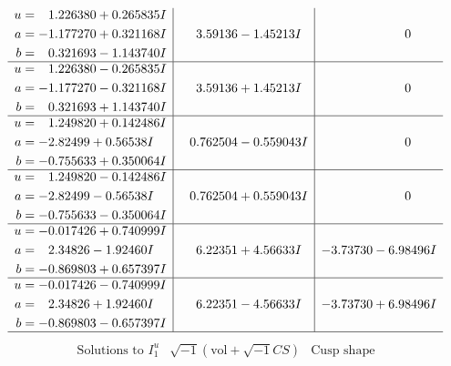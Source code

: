 \documentclass[1p]{elsarticle_modified}
\theoremstyle{definition}
\newcommand{\I}{\sqrt{-1}}
\begin{document}
$$\begin{array}{c|c|c}
\begin{aligned}
u &= \phantom{-}1.226380 + 0.265835 I \\
a &= -1.177270 + 0.321168 I \\
b &= \phantom{-}0.321693 - 1.143740 I\end{aligned}
 & \phantom{-}3.59136 - 1.45213 I & \phantom{-0.000000 } 0 \\ \hline\begin{aligned}
u &= \phantom{-}1.226380 - 0.265835 I \\
a &= -1.177270 - 0.321168 I \\
b &= \phantom{-}0.321693 + 1.143740 I\end{aligned}
 & \phantom{-}3.59136 + 1.45213 I & \phantom{-0.000000 } 0 \\ \hline\begin{aligned}
u &= \phantom{-}1.249820 + 0.142486 I \\
a &= -2.82499 + 0.56538 I \\
b &= -0.755633 + 0.350064 I\end{aligned}
 & \phantom{-}0.762504 - 0.559043 I & \phantom{-0.000000 } 0 \\ \hline\begin{aligned}
u &= \phantom{-}1.249820 - 0.142486 I \\
a &= -2.82499 - 0.56538 I \\
b &= -0.755633 - 0.350064 I\end{aligned}
 & \phantom{-}0.762504 + 0.559043 I & \phantom{-0.000000 } 0 \\ \hline\begin{aligned}
u &= -0.017426 + 0.740999 I \\
a &= \phantom{-}2.34826 - 1.92460 I \\
b &= -0.869803 + 0.657397 I\end{aligned}
 & \phantom{-}6.22351 + 4.56633 I & -3.73730 - 6.98496 I \\ \hline\begin{aligned}
u &= -0.017426 - 0.740999 I \\
a &= \phantom{-}2.34826 + 1.92460 I \\
b &= -0.869803 - 0.657397 I\end{aligned}
 & \phantom{-}6.22351 - 4.56633 I & -3.73730 + 6.98496 I\\
 \hline 
 \end{array}$$\newpage$$\begin{array}{c|c|c}  
\text{Solutions to }I^u_{1}& \I (\text{vol} + \sqrt{-1}CS) & \text{Cusp shape}\\
 \hline 
\begin{aligned}

\end{aligned}
\end{array}$$
\end{document}

